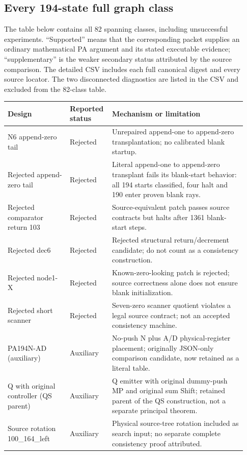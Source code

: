 \subsection{Every 194-state full graph class}
The table below contains all 82 spanning classes, including unsuccessful
experiments. ``Supported'' means that the corresponding packet supplies an
ordinary mathematical PA argument and its stated executable evidence;
``supplementary'' is the weaker secondary status attributed by the source
comparison. The detailed CSV includes each full canonical digest and every
source locator. The two disconnected diagnostics are listed in the CSV and
excluded from the 82-class table.
\begingroup\scriptsize
\begin{longtable}{@{}p{0.25\linewidth}p{0.14\linewidth}p{0.54\linewidth}@{}}
\toprule Design & Reported status & Mechanism or limitation \\ \midrule\endhead
N6 append-\allowbreak{}zero tail & Rejected & Unrepaired append-one to append-zero transplantation; no calibrated blank startup. \\
Rejected append-\allowbreak{}zero tail & Rejected & Literal append-one to append-zero transplant fails its blank-start behavior: all 194 starts classified, four halt and 190 enter proven blank rays. \\
Rejected comparator return 103 & Rejected & Source-equivalent patch passes source contracts but halts after 1361 blank-start steps. \\
Rejected dec6 & Rejected & Rejected structural return/decrement candidate; do not count as a consistency construction. \\
Rejected node1-\allowbreak{}X & Rejected & Known-zero-looking patch is rejected; source correctness alone does not ensure blank initialization. \\
Rejected short scanner & Rejected & Seven-zero scanner quotient violates a legal source contract; not an accepted consistency machine. \\
PA194N-\allowbreak{}AD (auxiliary) & Auxiliary & No-push N plus A/D physical-register placement; originally JSON-only comparison candidate, now retained as a literal table. \\
Q with original controller (QS parent) & Auxiliary & Q emitter with original dummy-push MP and original sum Shift; retained parent of the QS construction, not a separate principal theorem. \\
Source rotation 100\_\allowbreak{}164\_\allowbreak{}left & Auxiliary & Physical source-tree rotation included as search input; no separate complete consistency proof attributed. \\

\end{longtable}
